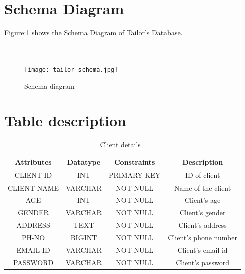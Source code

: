 \documentclass[12pt, letter paper]{report}
\begin{document}
{\section{Schema Diagram} 
Figure:\ref{fig:tailor_schema.jpg} shows the Schema Diagram of Tailor's Database.
\\
\\
\\
\begin{figure}[h]
 \centering
 \texttt{[image: tailor\_schema.jpg]}
 \caption{Schema diagram}
 \label{fig:tailor_schema.jpg}
\end{figure}
\section{Table description} 
\begin{center}
\begin{table}[h!]
\centering
    \begin{tabular}{|c|c|c|c|}
    \hline
      Attributes &Datatype &Constraints&Description  \\
      \hline
      \hline
         CLIENT-ID&INT&PRIMARY KEY&ID of client  \\
         \hline
         CLIENT-NAME&VARCHAR&NOT NULL& Name of the client\\ 
         \hline
         AGE&INT&NOT NULL& Client's age\\ 
         \hline
         GENDER&VARCHAR&NOT NULL&Client's gender\\
         \hline
         ADDRESS&TEXT&NOT NULL&Client's address\\
         \hline
         PH-NO&BIGINT&NOT NULL&Client's phone number\\
         \hline
         EMAIL-ID&VARCHAR&NOT NULL&Client's email id\\
         \hline
         PASSWORD&VARCHAR&NOT NULL&Client's password\\
         \hline
    \end{tabular}
    \caption{Client details .}
\label{table:1}
    \end{table}
\end{center}

}
\end{document}
